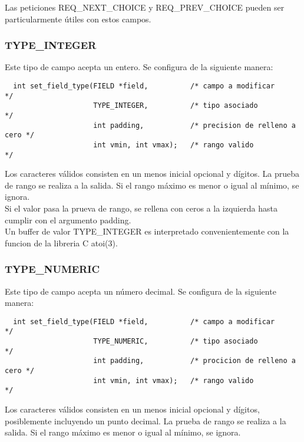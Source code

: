 \documentclass{article}
\begin{document}
Las peticiones REQ\_NEXT\_CHOICE y REQ\_PREV\_CHOICE pueden ser particularmente
útiles con estos campos.

\subsubsection*{TYPE\_INTEGER}%
Este tipo de campo acepta un entero. Se configura de la siguiente manera:

\begin{verbatim}
  int set_field_type(FIELD *field,          /* campo a modificar           */
                     TYPE_INTEGER,          /* tipo asociado               */
                     int padding,           /* precision de relleno a cero */
                     int vmin, int vmax);   /* rango valido                */
\end{verbatim}

Los caracteres válidos consisten en un menos inicial opcional y dígitos. La
prueba de rango se realiza a la salida. Si el rango máximo es menor o igual al
mínimo, se ignora.\\

Si el valor pasa la prueva de rango, se rellena con ceros a la izquierda hasta
cumplir con el argumento padding.\\

Un buffer de valor TYPE\_INTEGER es interpretado convenientemente con la funcion
de la libreria C atoi(3).

\subsubsection*{TYPE\_NUMERIC}%
Este tipo de campo acepta un número decimal. Se configura de la siguiente
manera:

\begin{verbatim}
  int set_field_type(FIELD *field,          /* campo a modificar           */
                     TYPE_NUMERIC,          /* tipo asociado               */
                     int padding,           /* procicion de relleno a cero */
                     int vmin, int vmax);   /* rango valido                */
\end{verbatim}

Los caracteres válidos consisten en un menos inicial opcional y dígitos,
posiblemente incluyendo un punto decimal. La prueba de rango se realiza a la
salida. Si el rango máximo es menor o igual al mínimo, se ignora.\\
\end{document}
